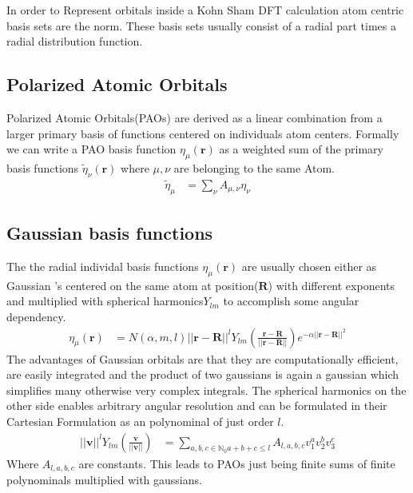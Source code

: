 In order to Represent orbitals inside a Kohn Sham DFT calculation atom centric basis sets are the norm.
These basis sets usually consist of a radial part times a radial distribution function.
\subsection{Polarized Atomic Orbitals}
Polarized Atomic Orbitals(PAOs) are derived as a linear combination from a larger primary basis of functions centered on individuals atom centers. Formally we can write a PAO basis function $\eta_{\mu}(\mathbf{r})$ as a weighted sum of the primary basis functions $\tilde\eta_\nu(\mathbf{r})$ where $\mu,\nu$ are belonging to the same Atom.
\begin{align}
    \tilde \eta_{\mu} &=\sum\limits_{\nu} A_{\mu,\nu} \eta_{\nu} 
\end{align}
\subsection{Gaussian basis functions}
The the radial individal basis functions $\eta_{\mu}(\mathbf{r})$ are usually chosen either as Gaussian
's centered on the same atom at position($\mathbf{R}$) with different exponents and multiplied with spherical harmonics$Y_{lm}$ to accomplish some angular dependency.
\begin{align}
    \eta_{\mu}(\mathbf{r}) &= N(\alpha,m,l) ||\mathbf{r}-\mathbf{R}||^l Y_{lm}(\frac{\mathbf{r}-\mathbf{R}}{||\mathbf{r}-\mathbf{R}||}) e^{-\alpha ||\mathbf{r}-\mathbf{R}||^2}
\end{align}
The advantages of Gaussian orbitals are that they are computationally efficient, are easily integrated and the product of two gaussians is again a gaussian which simplifies many otherwise very complex integrals.
The spherical harmonics on the other side enables arbitrary angular resolution and can be formulated in their Cartesian Formulation as an polynominal of just order $l$.
\begin{align}
    ||\mathbf{v}||^l Y_{lm}(\frac{\mathbf{v}}{||\mathbf{v}||}) &= \sum\limits_{a,b,c\in \mathbb{N}_0 a+b+c\leq l} A_{l,a,b,c} v_1^a v_2^b v_3^c
\end{align}
Where $A_{l,a,b,c}$ are constants. This leads to PAOs just being finite sums of finite polynominals multiplied with gaussians.


